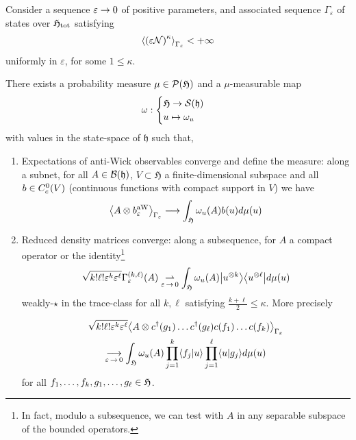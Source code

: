 \documentclass[AHL,Unicode,longabstracts,published]{cedram}
\newcommand{\wto}{\rightharpoonup}
\newcommand{\cS}{\mathcal{S}}
\newcommand{\cN}{\mathcal{N}}
\newcommand{\gH}{\mathfrak{H}}
\newcommand{\gh}{\mathfrak{h}}
\newcommand{\cB}{\mathcal{B}}
\newcommand{\cP}{\mathcal{P}}
\newcommand{\1}{\mathds{1}}
\newcommand{\eps}{\varepsilon}
\newcommand{\cda}{c^{\dagger}}
\newcommand{\gHt}{\mathfrak{H}_{\rm tot}}
\let\oldin\in
\renewcommand{\in}{\mathchoice{\oldin}{\oldin}{\,\oldin\,}{\,\oldin\,}}
\renewcommand*{\to}{\mathchoice{\longrightarrow}{\rightarrow}{\rightarrow}{\rightarrow}}
\let\oldmapsto\mapsto
\renewcommand*{\mapsto}{\mathchoice{\longmapsto}{\oldmapsto}{\oldmapsto}{\oldmapsto}}
\let\originalleft\left
\let\originalright\right
\renewcommand{\left}{\mathopen{}\mathclose\bgroup\originalleft}
\renewcommand{\right}{\aftergroup\egroup\originalright}
\begin{document}
\begin{theo}\label{thm:deF comp}
Consider a sequence $\eps \to 0$ of positive parameters, and associated sequence $\Gamma_\eps$ of states over $\gHt$ satisfying
\begin{equation}\label{eq:control_N}
\left\langle \left(\eps \cN \right)^\kappa \right\rangle_{\Gamma_{\eps}} < + \infty 
\end{equation}
uniformly in $\eps$, for some $1 \leq \kappa$.

There exists a probability measure $\mu \in \cP (\gH)$ and a $\mu$-measurable map
\begin{equation*}
\omega :
\begin{cases}
\gH \to \cS (\gh)\\
u \mapsto \omega_u
\end{cases}
\end{equation*}
with values in the state-space of $\gh$ such that,
\begin{enumerate}
\item\label{theo4.3.1} Expectations of anti-Wick observables converge and define the measure: along a subnet, for all $A\in \cB(\gh)$, $V \subset \gH$ a finite-dimensional subspace and all $b\in C^0_c (V)$ (continuous functions with compact support in $V$) we have
\begin{equation}\label{eq:AW CV comp}
\left\langle A \otimes b^{\rm aW}_{\eps} \right\rangle_{\Gamma_\eps} \to \int_{ \gH} \omega_u (A) b(u) d\mu (u)
\end{equation}
\item\label{theo4.3.2} Reduced density matrices converge: along a subsequence, for $A$ a compact operator or the identity\footnote{In fact, modulo a subsequence, we can test with $A$ in any separable subspace of the bounded operators.}
\begin{equation}\label{eq:CV DM comp}
\sqrt{k! \ell ! \eps^k \eps^\ell}\Gamma_\eps^{(k,\ell)} (A)
\underset{\eps\,\to\,0}{\wto} \int_{\gH} \omega_u (A) \left|u^{\otimes k} \right\rangle \left\langle u^{\otimes \ell}\right| d\mu (u)
\end{equation}
weakly-$\star$ in the trace-class for all $k,\ell$ satisfying $\frac{k+\ell}{2} \leq \kappa$. More precisely

\goodbreak 
\pagebreak
\begin{multline*}
\sqrt{k! \ell ! \eps ^k \eps^\ell}\left\langle A \otimes \cda (g_1) \ldots \cda (g_\ell) c (f_1) \ldots c(f_k) \right\rangle_{\Gamma_{\eps}}\\
\underset{\eps\,\to\,0}{\to} \int_{\gH} \omega_u (A) \prod_{j=1} ^k \langle f_j | u \rangle \prod_{j=1}^\ell \langle u | g_j \rangle d\mu (u)
\end{multline*}
for all $f_1,\ldots,f_k,g_1,\ldots,g_\ell \in \gH$.
\end{enumerate}
\end{theo}
\end{document}
